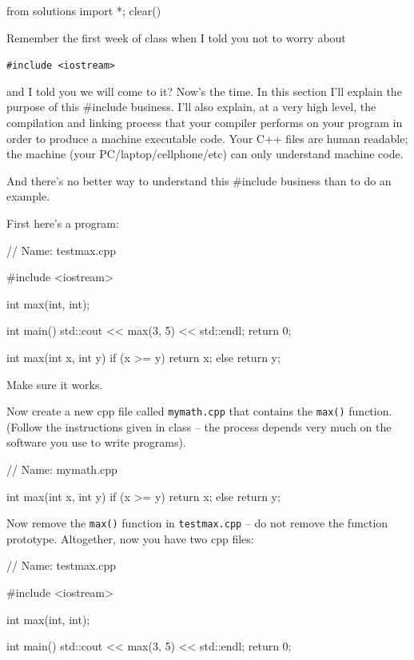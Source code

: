 \begin{python0}
from solutions import *; clear()
\end{python0}

Remember the first week of class when I told you not to worry about

\verb!#include <iostream>!

and I told you we will come to it? Now's the time. In
this section I'll explain the purpose of this \#include
business. I'll also explain, at a very high level, the
compilation and linking process that your compiler performs on your
program in order to produce a machine executable code. Your C++ files
are human readable; the machine (your PC/laptop/cellphone/etc) can only
understand machine code.

And there's no better way to understand this \#include
business than to do an example.

First here's a program:

\begin{consolethree}[escapeinside=||]
// Name: testmax.cpp

#include <iostream>

int max(int, int);

int main()
{
    std::cout << max(3, 5) << std::endl;
    return 0;
}

int max(int x, int y)
{
    if (x >= y)
        return x;
    else
        return y;
}
\end{consolethree}

Make sure it works.

Now create a new cpp file called \texttt{mymath.cpp} that contains the
\texttt{max()} function. (Follow the instructions given in class -- the
process depends very much on the software you use to write programs).

\begin{consolethree}[escapeinside=||]
// Name: mymath.cpp

int max(int x, int y)
{
    if (x >= y)
        return x;
    else
        return y;
}
\end{consolethree}

Now remove the \texttt{max()} function in \texttt{testmax.cpp} -- do not
remove the function prototype. Altogether, now you have two cpp files:

\begin{consolethree}[escapeinside=||]
// Name: testmax.cpp

#include <iostream>

int max(int, int);

int main()
{
    std::cout << max(3, 5) << std::endl;
    return 0;
}
\end{consolethree}

